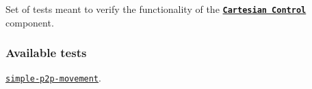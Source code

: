 Set of tests meant to verify the functionality of the \href{http://wiki.icub.org/iCub/main/dox/html/icub_cartesian_interface.html}{\tt {\bfseries Cartesian Control}} component.

\subsubsection*{Available tests}


\begin{DoxyItemize}
\item \href{https://github.com/robotology/icub-tests/blob/master/src/cartesian-control/simple-p2p-movement}{\tt {\ttfamily simple-\/p2p-\/movement}}. 
\end{DoxyItemize}